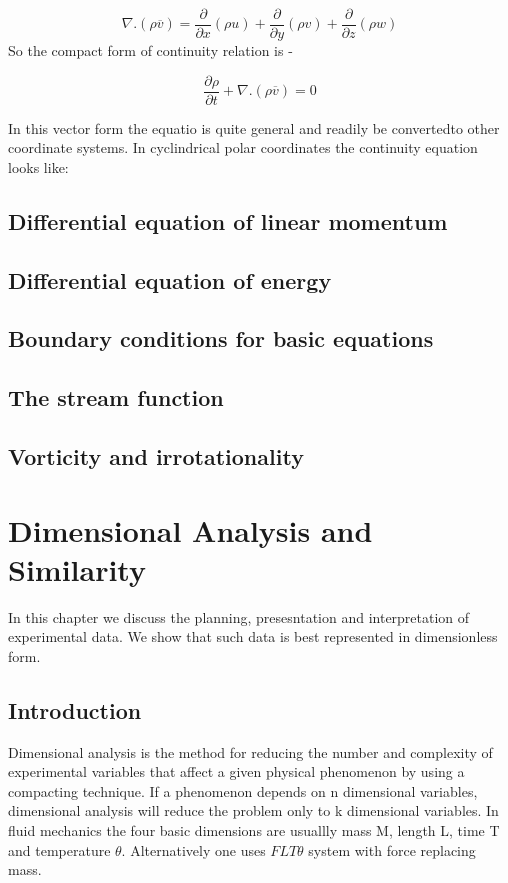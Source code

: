 \documentclass{report}
\begin{document}
\[ \nabla.(\rho \overline{v}) = \frac{\partial}{\partial x}(\rho u) + \frac{\partial}{\partial y}(\rho v) + \frac{\partial}{\partial z}(\rho w) \]
So the compact form of continuity relation is -

\[ \frac{\partial \rho}{\partial t} + \nabla.(\rho \overline{v}) = 0\]

In this vector form the equatio is quite general and readily be convertedto other coordinate systems.
In cyclindrical polar coordinates the continuity equation looks like:

\section{Differential equation of linear momentum}


\section{Differential equation of energy}
\section{Boundary conditions for basic equations}
\section{The stream function}
\section{Vorticity and irrotationality}
\chapter{Dimensional Analysis and Similarity}
In this chapter we discuss the planning, presesntation and interpretation of experimental data.
We show that such data is best represented in dimensionless form.
\section{Introduction}
Dimensional analysis is the method for reducing the number and complexity of experimental variables that affect a given physical phenomenon
by using a compacting technique. If a phenomenon depends on n dimensional variables, dimensional analysis will reduce the problem only to
k dimensional variables. In fluid mechanics the four basic dimensions are usuallly mass M, length L, time T and temperature \(\theta\). Alternatively
one uses \(FLT\theta\) system with force replacing mass.
\end{document}
